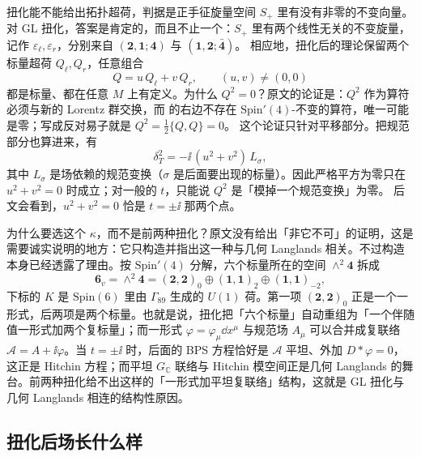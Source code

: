 扭化能不能给出拓扑超荷，判据是正手征旋量空间 $S_+$ 里有没有非零的不变向量。对 GL 扭化，答案是肯定的，而且不止一个：$S_+$ 里有两个线性无关的不变旋量，记作 $\varepsilon_\ell,\varepsilon_r$，分别来自 $(\mathbf 2,\mathbf 1;\mathbf 4)$ 与 $(\mathbf 1,\mathbf 2;\bar{\mathbf 4})$。 相应地，扭化后的理论保留两个标量超荷 $Q_\ell,Q_r$，任意组合
\begin{equation}
Q=u\,Q_\ell+v\,Q_r,\qquad (u,v)\neq(0,0)
\label{eq:Q-combo}
\end{equation}
都是标量、都在任意 $M$ 上有定义。为什么 $Q^2=0$？原文的论证是：$Q^2$ 作为算符必须与新的 Lorentz 群交换，而  的右边不存在 $\mathrm{Spin}'(4)$-不变的算符，唯一可能是零；写成反对易子就是 $Q^2=\tfrac12\{Q,Q\}=0$。 这个论证只针对平移部分。把规范部分也算进来，有
\begin{equation}
\delta_T^2=-\ii\,(u^2+v^2)\,L_\sigma,
\label{eq:deltaT2}
\end{equation}
其中 $L_\sigma$ 是场依赖的规范变换（$\sigma$ 是后面要出现的标量）。因此严格平方为零只在 $u^2+v^2=0$ 时成立；对一般的 $t$，只能说 $Q^2$ 是「模掉一个规范变换」为零。 后文会看到，$u^2+v^2=0$ 恰是 $t=\pm\ii$ 那两个点。

为什么要选这个 $\kappa$，而不是前两种扭化？原文没有给出「非它不可」的证明，这是需要诚实说明的地方：它只构造并指出这一种与几何 Langlands 相关。不过构造本身已经透露了理由。按 $\mathrm{Spin}'(4)$ 分解，六个标量所在的空间 $\wedge^2\mathbf 4$ 拆成
\begin{equation}
\mathbf 6_v=\wedge^2\mathbf 4
=(\mathbf 2,\mathbf 2)_0\oplus(\mathbf 1,\mathbf 1)_{2}\oplus(\mathbf 1,\mathbf 1)_{-2},
\label{eq:6-decomp}
\end{equation}
下标的 $K$ 是 $\mathrm{Spin}(6)$ 里由 $\Gamma_{89}$ 生成的 $U(1)$ 荷。第一项 $(\mathbf 2,\mathbf 2)_0$ 正是一个一形式，后两项是两个标量。也就是说，扭化把「六个标量」自动重组为「一个伴随值一形式加两个复标量」；而一形式 $\varphi=\varphi_\mu\dd x^\mu$ 与规范场 $A_\mu$ 可以合并成复联络 $\mathcal A=A+\ii\varphi$。当 $t=\pm\ii$ 时，后面的 BPS 方程恰好是 $\mathcal A$ 平坦、外加 $D{*}\varphi=0$，这正是 Hitchin 方程；而平坦 $G_{\mathbb C}$ 联络与 Hitchin 模空间正是几何 Langlands 的舞台。前两种扭化给不出这样的「一形式加平坦复联络」结构，这就是 GL 扭化与几何 Langlands 相连的结构性原因。

\subsection{扭化后场长什么样}

